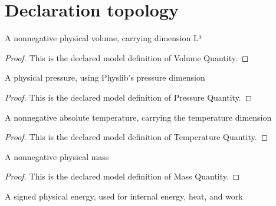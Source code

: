 \section{Declaration topology}
\begin{definition}
  \label{def:physics:phyx-mini-0415:phyxminiproblems-problemphyxmini0415-volumequantity}
  A nonnegative physical volume, carrying dimension L³
\end{definition}
\begin{proof}
  This is the declared model definition of Volume Quantity.
\end{proof}
\begin{definition}
  \label{def:physics:phyx-mini-0415:phyxminiproblems-problemphyxmini0415-pressurequantity}
  A physical pressure, using Physlib's pressure dimension
\end{definition}
\begin{proof}
  This is the declared model definition of Pressure Quantity.
\end{proof}
\begin{definition}
  \label{def:physics:phyx-mini-0415:phyxminiproblems-problemphyxmini0415-temperaturequantity}
  A nonnegative absolute temperature, carrying the temperature dimension
\end{definition}
\begin{proof}
  This is the declared model definition of Temperature Quantity.
\end{proof}
\begin{definition}
  \label{def:physics:phyx-mini-0415:phyxminiproblems-problemphyxmini0415-massquantity}
  A nonnegative physical mass
\end{definition}
\begin{proof}
  This is the declared model definition of Mass Quantity.
\end{proof}
\begin{definition}
  \label{def:physics:phyx-mini-0415:phyxminiproblems-problemphyxmini0415-energyquantity}
  A signed physical energy, used for internal energy, heat, and work
\end{definition}
